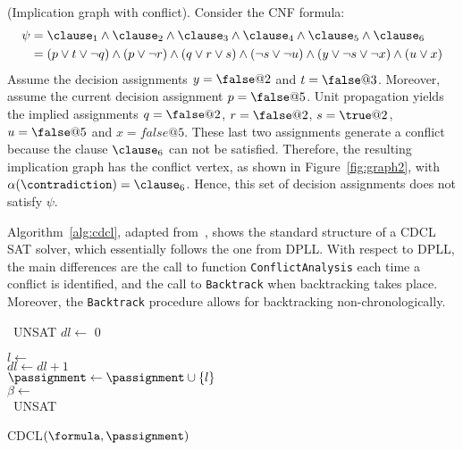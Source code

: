 \begin{example}%
    \label{ex:graph2}
    (Implication graph with conflict). Consider the CNF formula:
    \begin{align*}
        \psi & = \clause_1 \land \clause_2 \land \clause_3 \land \clause_4 \land \clause_5 \land \clause_6  \\
                 & = (p \lor t \lor \neg q) \land (p \lor \neg r) \land (q \lor r \lor s) \land (\neg s \lor \neg u) \land (y \lor \neg s \lor \neg x) \land (u \lor x)
    \end{align*}
    Assume the decision assignments $y = \false @2$ and $t = \false @3$.
    Moreover, assume the current decision assignment $p = \false @5$.  Unit
    propagation yields the implied assignments $q = \false @2$, $r = \false @2$,
    $s = \true @2$, $u = \false @5$ and $x = false @5$. These last two
    assignments generate a conflict because the clause $\clause_6$ can not be
    satisfied. Therefore, the resulting implication graph has the conflict
    vertex, as shown in Figure~\ref{fig:graph2}, with $\alpha(\contradiction) =
    \clause_6$.  Hence, this set of decision assignments does not satisfy
    $\psi$.
    
\end{example}

Algorithm~\ref{alg:cdcl}, adapted from~\cite{cdclchapter}, shows the standard
structure of a CDCL SAT solver, which essentially follows the one from DPLL\@.
With respect to DPLL, the main differences are the call to function
\texttt{ConflictAnalysis} each time a conflict is identified, and the call to
\texttt{Backtrack} when backtracking takes place. Moreover, the
\texttt{Backtrack} procedure allows for backtracking non-chronologically. 

\begin{algorithm}[!ht]
    {\Return~UNSAT}
    $dl \leftarrow$ 0

    \While{$\neg$\alvarass{$\formula$, $\passignment$}}
    {%
        $l \leftarrow$ \pickvar{$\formula$, $\passignment$}\\
        $dl \leftarrow dl + 1$\\
        $\passignment \leftarrow \passignment \cup \{l\}$\\
        {%
            $\beta \leftarrow$ \\
            {\Return~UNSAT}
        }
    }
    \caption{CDCL$(\formula, \passignment)$}%
\label{alg:cdcl}
\end{algorithm}

